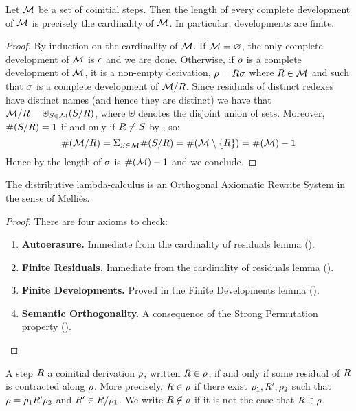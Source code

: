 \begin{lemma}
Let $\mathcal{M}$ be a set of coinitial steps.
Then the length of every complete development of $\mathcal{M}$
is precisely the cardinality of $\mathcal{M}$.
In particular, developments are finite.
\end{lemma}
\begin{proof}
By induction on the cardinality of $\mathcal{M}$.
If $\mathcal{M} = \varnothing$, the only complete development of $\mathcal{M}$ is $\epsilon$ and we are done.
Otherwise, if $\rho$ is a complete development of $\mathcal{M}$, it is a non-empty derivation, \ie
$\rho = R\sigma$
where $R \in \mathcal{M}$
and such that $\sigma$ is a complete development of $\mathcal{M}/R$.
Since residuals of distinct redexes have distinct names (and hence they are distinct)
we have that
$
  \mathcal{M}/R = \uplus_{S \in \mathcal{M}} (S/R)
$,
where $\uplus$ denotes the disjoint union of sets.
Moreover, $\#(S/R) = 1$ if and only if $R \neq S$
by , so:
\[
  \#(\mathcal{M}/R) =
  \Sigma_{S \in \mathcal{M}} \#(S/R) =
  \#(\mathcal{M} \setminus \{R\}) =
  \#(\mathcal{M}) - 1
\]
Hence by \ih the length of $\sigma$ is $\#(\mathcal{M}) - 1$
and we conclude.
\end{proof}

\begin{proposition}
The distributive lambda-calculus is an Orthogonal Axiomatic Rewrite System
in the sense of Melli\`es.
\end{proposition}
\begin{proof}
There are four axioms to check:
\begin{enumerate}
\item {\bf Autoerasure.}
  Immediate from the cardinality of residuals lemma ().
\item {\bf Finite Residuals.}
  Immediate from the cardinality of residuals lemma ().
\item {\bf Finite Developments.}
  Proved in the Finite Developments lemma ().
\item {\bf Semantic Orthogonality.}
  A consequence of the Strong Permutation property ().
\end{enumerate}
\end{proof}

\begin{definition}
A step $R$  a coinitial derivation $\rho$,
written $R \in \rho$,
if and only if some residual of $R$ is contracted along $\rho$. 
More precisely, $R \in \rho$ if there exist $\rho_1,R',\rho_2$
such that $\rho = \rho_1R'\rho_2$ and $R' \in R/\rho_1$.
We write $R \not\in \rho$ if it is not the case that $R \in \rho$.
\end{definition}


